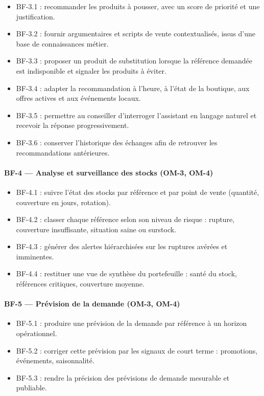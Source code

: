 \begin{itemize}[label=--]
    \item BF-3.1 : recommander les produits à pousser, avec un score de priorité et une justification.
    \item BF-3.2 : fournir argumentaires et scripts de vente contextualisés, issus d'une base de connaissances métier.
    \item BF-3.3 : proposer un produit de substitution lorsque la référence demandée est indisponible et signaler les produits à éviter.
    \item BF-3.4 : adapter la recommandation à l'heure, à l'état de la boutique, aux offres actives et aux événements locaux.
    \item BF-3.5 : permettre au conseiller d'interroger l'assistant en langage naturel et recevoir la réponse progressivement.
    \item BF-3.6 : conserver l'historique des échanges afin de retrouver les recommandations antérieures.
\end{itemize}

\paragraph{BF-4 — Analyse et surveillance des stocks \textnormal{(OM-3, OM-4)}}

\begin{itemize}[label=--]
    \item BF-4.1 : suivre l'état des stocks par référence et par point de vente (quantité, couverture en jours, rotation).
    \item BF-4.2 : classer chaque référence selon son niveau de risque : rupture, couverture insuffisante, situation saine ou surstock.
    \item BF-4.3 : générer des alertes hiérarchisées sur les ruptures avérées et imminentes.
    \item BF-4.4 : restituer une vue de synthèse du portefeuille : santé du stock, références critiques, couverture moyenne.
\end{itemize}

\paragraph{BF-5 — Prévision de la demande \textnormal{(OM-3, OM-4)}}

\begin{itemize}[label=--]
    \item BF-5.1 : produire une prévision de la demande par référence à un horizon opérationnel.
    \item BF-5.2 : corriger cette prévision par les signaux de court terme : promotions, événements, saisonnalité.
    \item BF-5.3 : rendre la précision des prévisions de demande mesurable et publiable.
\end{itemize}

